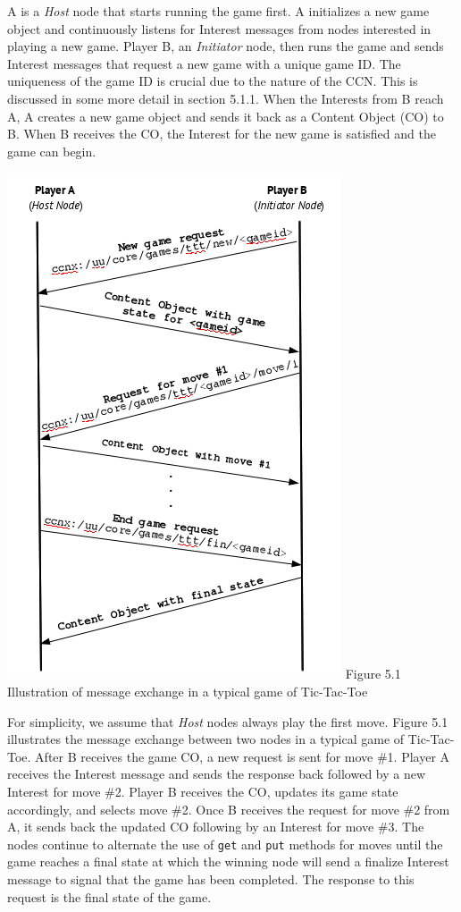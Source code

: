 \documentclass[a4paper,12pt]{report}      %
\begin{document}
A is a \emph{Host} node that starts running the game first. A initializes a new game object and continuously
 listens for Interest messages from nodes interested in playing a new game. Player B, an \emph{Initiator} node, 
then runs the game and sends Interest messages that request a new game with a unique game ID. The uniqueness of the game ID is
crucial due to the nature of the CCN. This is discussed in some more detail in section 5.1.1. When the
Interests from B reach A, A creates a new game object and sends it back as a Content Object (CO)
to B. When B receives the CO, the Interest for the new game is satisfied and the game can begin.

\begin{center}\includegraphics[scale=0.85]{dtgp_msgx.jpg}\newline
Figure 5.1 Illustration of message exchange in a typical game of Tic-Tac-Toe
\end{center}

For simplicity, we assume that \emph{Host} nodes always play the first move. Figure 5.1 illustrates
the message exchange between two nodes in a typical game of Tic-Tac-Toe. After B receives the game CO, a
new request is sent for move \#1. Player A receives the Interest message and sends the response back
followed by a new Interest for move \#2. Player B receives the CO, updates its game state accordingly,
and selects move \#2. Once B receives the request for move \#2 from A, it sends back the updated CO following by an 
Interest for move \#3. The nodes continue to alternate the use of \verb!get! and \verb!put! methods for moves until
 the game reaches a final state at which the winning node will send a finalize Interest message to signal
 that the game has been completed. The response to this request is the final state of the game.
\end{document}
